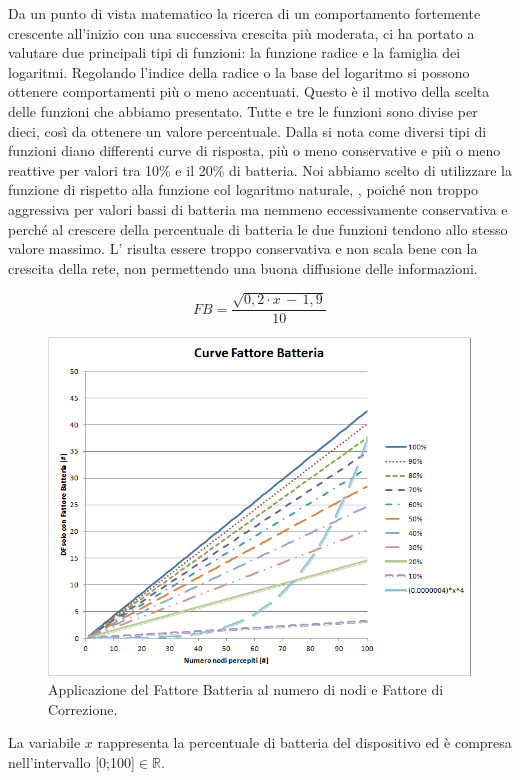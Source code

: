 Da un punto di vista matematico la ricerca di un comportamento fortemente crescente all'inizio con una successiva crescita più moderata, ci ha portato a valutare due principali tipi di funzioni: la funzione radice e la famiglia dei logaritmi. Regolando l'indice della radice o la base del logaritmo si possono ottenere comportamenti più o meno accentuati. Questo è il motivo della scelta delle funzioni che abbiamo presentato.
Tutte e tre le funzioni sono divise per dieci, così da ottenere un valore percentuale. Dalla  si nota come diversi tipi di funzioni diano differenti curve di risposta, più o meno conservative e più o meno reattive per valori tra 10\% e il 20\% di batteria. Noi abbiamo scelto di utilizzare la funzione di  rispetto alla funzione col logaritmo naturale, , poiché non troppo aggressiva per valori bassi di batteria ma nemmeno eccessivamente conservativa e perché al crescere della percentuale di batteria le due funzioni tendono allo stesso valore massimo. L' risulta essere troppo conservativa e non scala bene con la crescita della rete, non permettendo una buona diffusione delle informazioni.
\medskip

\begin{equation}
	\label{eq:df_FB}
	FB = \dfrac{\sqrt{0,2\cdot x\,-\,1,9}}{10}
\end{equation}
\begin{figure}[tb]
	\centering
	\includegraphics[width=0.9\linewidth]{Images/grafici_usati/DF_curve_fattore_batteria_corr}
	\caption[DF curve fb con correzione]{Applicazione del Fattore Batteria al numero di nodi e Fattore di Correzione.}
	\label{fig:DF_curve_fattore_batteria_corr}
\end{figure}
La variabile $\textit{x}$ rappresenta la percentuale di batteria del dispositivo ed è compresa nell'intervallo [0;100]$\in\mathbb{R}$.

